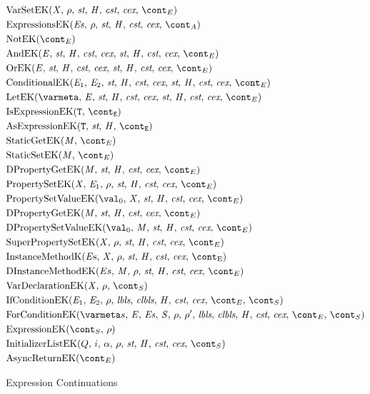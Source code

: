 \documentclass[a4paper,oneside,fleqn]{article}
\newcommand{\idmeta}{\ensuremath{\mathit{X}}}
\begin{document}
\begin{figure}[Htp]
  \begin{eqfigure}
  \begin{align}
    &\VarSetK{\idmeta}{\env}{\ExceptionHandlers}{\econt} \label{econt:varset}\\
    &\ExpressionsK{\exprs}{\env}{\acont} \label{econt:expressions}\\
    &\NotK{\econt} \label{econt:not}\\
    &\AndK{\expressionmeta}{\ExceptionHandlers}{\econt} \label{econt:and}\\
    &\OrK{\expressionmeta}{\ExceptionHandlers}{\econt} \label{econt:or}\\
    &\ConditionalK{\expressionmeta_1}{\expressionmeta_2}{\ExceptionHandlers}{\econt} \label{econt:cond}\\
    &\LetK{\varmeta}{\expressionmeta}{\ExceptionHandlers}{\econt} \label{econt:let}\\
    &\IsExpressionK \label{econt:is}\\
    &\AsExpressionK \label{econt:as}\\
    &\StaticGetK \label{econt:static-get}\\
    &\StaticSetK \label{econt:static-set}\\
    &\DPropertyGetK \label{econt:dproperty-get}\\
    &\PropertySetK \label{econt:property-set}\\
    &\PropertySetVK \label{econt:property-set}\\
    &\DPropertyGetK \label{econt:dproperty-set}\\
    &\DPropertySetVK \label{econt:dproperty-set-v}\\
    &\SuperPropertySetK \label{econt:super-property-set}\\
    &\InstanceMethodK{\strace} \label{econt:instance-method}\\
    &\DInstanceMethodK{\strace} \label{econt:dinstance-method}\\
    &\VarDeclK{\idmeta}{\env}{\scont} \label{econt:var-decl}\\
    &\IfCondK{\expressionmeta_1}{\expressionmeta_2} \label{econt:if-cond}\\
    &\ForCondK \label{econt:for-cond}\\
    &\ExpressionK{\scont}{\env} \label{econt:expression}\\
    &\InitializerListEK{Q}{i}{\loc}{\env}{\scont} \label{econt:initializer-list}\\
    &\AsyncReturnEK{\econt}
  \end{align}
  \caption{Expression Continuations}
  \label{figure:econts}
  \end{eqfigure}
\end{figure}
\end{document}
